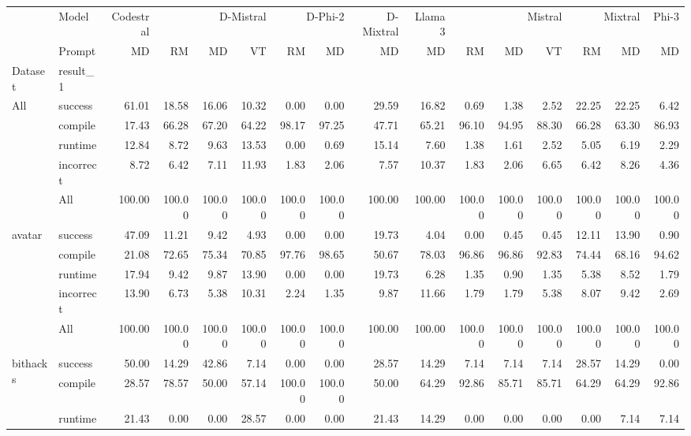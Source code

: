 \begin{tabular}{llrrrrrrrrrrrrrr}
\toprule
 & Model & Codestral & \multicolumn{3}{r}{D-Mistral} & \multicolumn{2}{r}{D-Phi-2} & D-Mixtral & Llama 3 & \multicolumn{3}{r}{Mistral} & \multicolumn{2}{r}{Mixtral} & Phi-3 \\
 & Prompt & MD & RM & MD & VT & RM & MD & MD & MD & RM & MD & VT & RM & MD & MD \\
Dataset & result_1 &  &  &  &  &  &  &  &  &  &  &  &  &  &  \\
\midrule
\multirow[t]{5}{*}{All} & success & 61.01 & 18.58 & 16.06 & 10.32 & 0.00 & 0.00 & 29.59 & 16.82 & 0.69 & 1.38 & 2.52 & 22.25 & 22.25 & 6.42 \\
 & compile & 17.43 & 66.28 & 67.20 & 64.22 & 98.17 & 97.25 & 47.71 & 65.21 & 96.10 & 94.95 & 88.30 & 66.28 & 63.30 & 86.93 \\
 & runtime & 12.84 & 8.72 & 9.63 & 13.53 & 0.00 & 0.69 & 15.14 & 7.60 & 1.38 & 1.61 & 2.52 & 5.05 & 6.19 & 2.29 \\
 & incorrect & 8.72 & 6.42 & 7.11 & 11.93 & 1.83 & 2.06 & 7.57 & 10.37 & 1.83 & 2.06 & 6.65 & 6.42 & 8.26 & 4.36 \\
 & All & 100.00 & 100.00 & 100.00 & 100.00 & 100.00 & 100.00 & 100.00 & 100.00 & 100.00 & 100.00 & 100.00 & 100.00 & 100.00 & 100.00 \\
\cline{1-16}
\multirow[t]{5}{*}{avatar} & success & 47.09 & 11.21 & 9.42 & 4.93 & 0.00 & 0.00 & 19.73 & 4.04 & 0.00 & 0.45 & 0.45 & 12.11 & 13.90 & 0.90 \\
 & compile & 21.08 & 72.65 & 75.34 & 70.85 & 97.76 & 98.65 & 50.67 & 78.03 & 96.86 & 96.86 & 92.83 & 74.44 & 68.16 & 94.62 \\
 & runtime & 17.94 & 9.42 & 9.87 & 13.90 & 0.00 & 0.00 & 19.73 & 6.28 & 1.35 & 0.90 & 1.35 & 5.38 & 8.52 & 1.79 \\
 & incorrect & 13.90 & 6.73 & 5.38 & 10.31 & 2.24 & 1.35 & 9.87 & 11.66 & 1.79 & 1.79 & 5.38 & 8.07 & 9.42 & 2.69 \\
 & All & 100.00 & 100.00 & 100.00 & 100.00 & 100.00 & 100.00 & 100.00 & 100.00 & 100.00 & 100.00 & 100.00 & 100.00 & 100.00 & 100.00 \\
\cline{1-16}
\multirow[t]{5}{*}{bithacks} & success & 50.00 & 14.29 & 42.86 & 7.14 & 0.00 & 0.00 & 28.57 & 14.29 & 7.14 & 7.14 & 7.14 & 28.57 & 14.29 & 0.00 \\
 & compile & 28.57 & 78.57 & 50.00 & 57.14 & 100.00 & 100.00 & 50.00 & 64.29 & 92.86 & 85.71 & 85.71 & 64.29 & 64.29 & 92.86 \\
 & runtime & 21.43 & 0.00 & 0.00 & 28.57 & 0.00 & 0.00 & 21.43 & 14.29 & 0.00 & 0.00 & 0.00 & 0.00 & 7.14 & 7.14 \\

\end{tabular}
